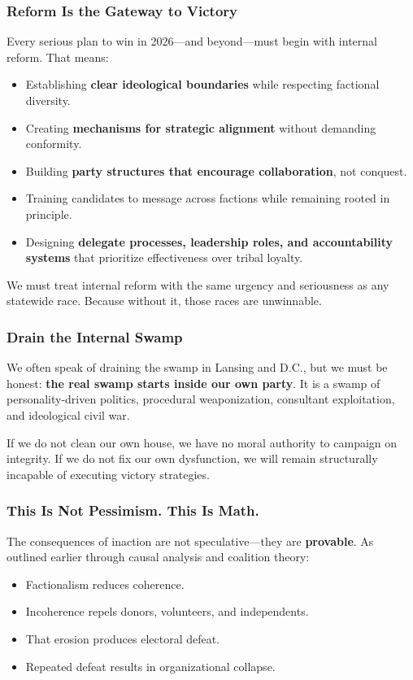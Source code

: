 \subsubsection{Reform Is the Gateway to Victory}
Every serious plan to win in 2026—and beyond—must begin with internal reform. That means:
\begin{itemize}
\item Establishing \textbf{clear ideological boundaries} while respecting factional diversity.
\item Creating \textbf{mechanisms for strategic alignment} without demanding conformity.
\item Building \textbf{party structures that encourage collaboration}, not conquest.
\item Training candidates to message across factions while remaining rooted in principle.
\item Designing \textbf{delegate processes, leadership roles, and accountability systems} that prioritize effectiveness over tribal loyalty.
\end{itemize}

We must treat internal reform with the same urgency and seriousness as any statewide race. Because without it, those races are unwinnable.

\subsubsection{Drain the Internal Swamp}
We often speak of draining the swamp in Lansing and D.C., but we must be honest: \textbf{the real swamp starts inside our own party}. It is a swamp of personality-driven politics, procedural weaponization, consultant exploitation, and ideological civil war.

If we do not clean our own house, we have no moral authority to campaign on integrity. If we do not fix our own dysfunction, we will remain structurally incapable of executing victory strategies.

\subsubsection{This Is Not Pessimism. This Is Math.}
The consequences of inaction are not speculative—they are \textbf{provable}. As outlined earlier through causal analysis and coalition theory:
\begin{itemize}
\item Factionalism reduces coherence.
\item Incoherence repels donors, volunteers, and independents.
\item That erosion produces electoral defeat.
\item Repeated defeat results in organizational collapse.
\end{itemize}

